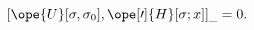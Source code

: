 \begin{equation}	\label{12.29new2}
[ \ope{U}[\sigma,\sigma_0] , \ope[\prime]{H}[\sigma;x] ]_{\_} = 0.
	\end{equation}

